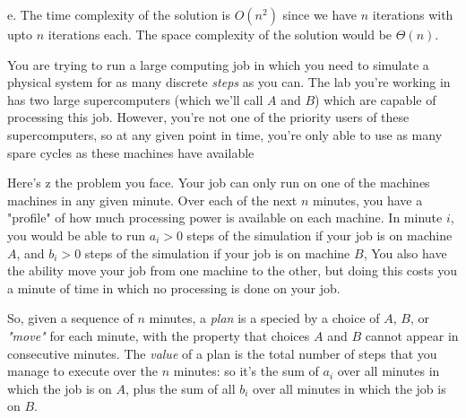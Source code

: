 \documentclass[12pt]{article}
\newenvironment{problem}[2][Problem]{\begin{trivlist}
\item[\hskip \labelsep {\bfseries #1}\hskip \labelsep {\bfseries #2.}]}{\end{trivlist}}
\begin{document}
e. The time complexity of the solution is $O(n^2)$ since we have $n$ iterations with upto $n$ iterations each. The space complexity of the solution would be $\Theta(n)$.
\begin{problem}{5}
   You are trying to run a large computing job in which you need to simulate a physical system for as many discrete \textit{steps} as you can. The lab you're working in has two large supercomputers (which we'll call $A$ and $B$) which are capable of processing this job. However, you're not one of the priority users of these supercomputers, so at any given point in time, you're only able to use as many spare cycles as these machines have available

   Here's   z the problem you face. Your job can only run on one of the machines machines in any given minute. Over each of the next $n$ minutes, you have a "profile" of how much processing power is available on each machine. In minute $i$, you would be able to run $a_i>0$ steps of the simulation if your job is on machine $A$, and $b_i>0$ steps of the simulation if your job is on machine $B$, You also have the ability move your job from one machine to the other, but doing this costs you a minute of time in which no processing is done on your job.

   So, given a sequence of $n$ minutes, a \textit{plan} is a specied by a choice of $A$, $B$, or \textit{"move"} for each minute, with the property that choices $A$ and $B$ cannot appear in consecutive minutes. The \textit{value} of a plan is the total number of steps that you manage to execute over the $n$ minutes: so it's the sum of $a_i$ over all minutes in which the job is on $A$, plus the sum of all $b_i$ over all minutes in which the job is on $B$.


\end{problem}
\end{document}
